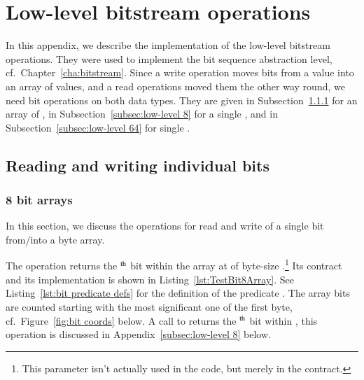 
\chapter{Low-level bitstream operations}
\label{cha:low-level bitstream}

In this appendix, we describe the implementation of the
low-level bitstream operations.
%
They were used to implement the bit sequence abstraction level, cf.\
Chapter~\ref{cha:bitstream}.
%
Since a write operation moves bits from a  value
into an array of  values, and a read operations
moved them the other way round,
we need bit operations on both data types.
%
They are given in
Subsection~\ref{subsec:low-level 8 array} 
for an array of , 
in Subsection~\ref{subsec:low-level 8} for a single ,
and
in Subsection~\ref{subsec:low-level 64} for single .













\section{Reading and writing individual bits}


\subsection{8 bit arrays}
\label{subsec:low-level 8 array}


In this section, we discuss the operations for read and write of a
single bit from/into a byte array.

The operation  returns the
$^{\mbox{\scriptsize th}}$ bit
within the array at 
of byte-size .\footnote{
	This parameter isn't actually used in the code, but merely
	in the contract.
}
Its contract and its implementation is shown in
Listing~\ref{lst:TestBit8Array}.
%
See Listing~\ref{lst:bit predicate defs} for the definition of the predicate
\inl{Bit8Array}.
%
The array bits are counted starting with the most significant one of
the first byte,
cf.\ Figure~\ref{fig:bit coords} below.
%
A call to  returns the 
$^{\mbox{\scriptsize th}}$ bit
within , this operation is discussed in
Appendix~\ref{subsec:low-level 8} below.








